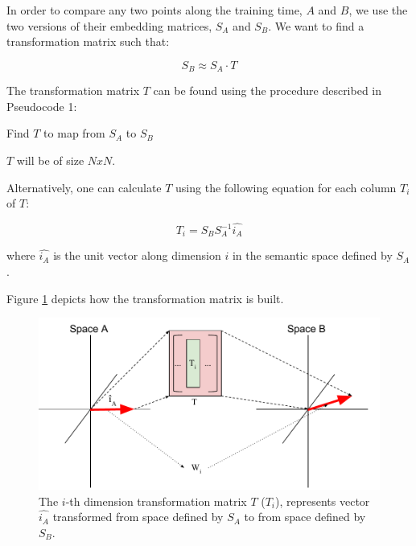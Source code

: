 \documentclass{article} %
\begin{document}
In order to compare any two points along the training time, $A$ and $B$, we use the two versions of their embedding matrices, $S_A$ and $S_B$. We want to find a transformation matrix such that:

$$S_B \approx S_A \cdot T$$

The transformation matrix $T$ can be found using the procedure described in Pseudocode 1:

\begin{algorithm}[H]
 \caption{Find $T$ to map from $S_A$ to $S_B$}
\end{algorithm}

$T$ will be of size $NxN$.

Alternatively, one can calculate $T$ using the following equation for each column $T_i$ of $T$:

$$T_i = S_B S_A^{-1} \widehat{i_A} $$

where $\widehat{i_A}$ is the unit vector along dimension $i$ in the semantic space defined by $S_A$.

Figure \ref{fig:transform} depicts how the transformation matrix is built.

\begin{figure}
 \includegraphics[width=\textwidth]{transformMatrix.pdf} 
 \caption{The $i$-th dimension transformation matrix $T$ ($T_i$), represents vector $\widehat{i_A}$ transformed from space defined by $S_A$ to from space defined by $S_B$.}
 \label{fig:transform}
\end{figure}
\end{document}
